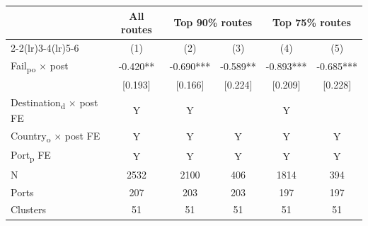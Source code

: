 {
\def\sym#1{\ifmmode^{#1}\else\(^{#1}\)\fi}
\begin{tabular}{l*{5}{c}}
\toprule
            &\multicolumn{1}{c}{All routes}&\multicolumn{2}{c}{Top 90\% routes}&\multicolumn{2}{c}{Top 75\% routes}\\\cmidrule(lr){2-2}\cmidrule(lr){3-4}\cmidrule(lr){5-6}
            &\multicolumn{1}{c}{(1)}   &\multicolumn{1}{c}{(2)}   &\multicolumn{1}{c}{(3)}   &\multicolumn{1}{c}{(4)}   &\multicolumn{1}{c}{(5)}   \\
\midrule
Fail\textsubscript{po} $\times$ post&      -0.420** &      -0.690***&      -0.589** &      -0.893***&      -0.685***\\
            &     [0.193]   &     [0.166]   &     [0.224]   &     [0.209]   &     [0.228]   \\
Destination\textsubscript{d} $\times$ post FE&           Y   &           Y   &               &           Y   &               \\
Country\textsubscript{o} $\times$ post FE&           Y   &           Y   &           Y   &           Y   &           Y   \\
Port\textsubscript{p} FE &           Y   &           Y   &           Y   &           Y   &           Y   \\
\midrule
N           &        2532   &        2100   &         406   &        1814   &         394   \\
Ports       &         207   &         203   &         203   &         197   &         197   \\
Clusters    &          51   &          51   &          51   &          51   &          51   \\
\bottomrule
\end{tabular}
}
